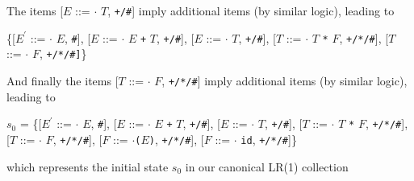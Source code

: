 \documentclass[8pt,a4paper,compress,handout]{beamer}
\newcommand{\mm}[1]{$#1$}
\newcommand{\expo}[2]{$#1^{#2}$}
\newcommand{\subs}[2]{${#1}_{#2}$}
\newenvironment{spaced}
{
\smallskip
\hspace{.5cm}
\begin{minipage}[c]{\textwidth}
}
{
\end{minipage}
\smallskip
}
\begin{document}
\begin{frame}[fragile]
\pause

The items [$E$  ::= $\cdot$ $T$, \lstinline{+/#}] imply additional items (by similar logic), leading to

\text{ }
\begin{spaced}
\begin{production}
\{[\expo{E}{\prime} ::= \mm{\cdot} \mm{E}, \lstinline{#}],
  [\mm{E}  ::= \mm{\cdot} \mm{E} \lstinline{+} \mm{T}, \lstinline{+/#}],
  [\mm{E}  ::= \mm{\cdot} \mm{T}, \lstinline{+/#}],
  [\mm{T}  ::= \mm{\cdot} \mm{T}  \lstinline{*} \mm{F}, \lstinline{+/*/#}],
  [\mm{T}  ::= \mm{\cdot} \mm{F}, \lstinline{+/*/#]}\}
\end{production}
\end{spaced}

\pause

And finally the items [$T$ ::= $\cdot$ $F$, \lstinline{+/*/#}] imply additional items (by similar logic), leading to

\text{ }
\begin{spaced}
\begin{production}
\subs{s}{0} = \{[\expo{E}{\prime} ::= \mm{\cdot} \mm{E}, \lstinline{#}],
         [\mm{E}  ::= \mm{\cdot} \mm{E} \lstinline{+} \mm{T}, \lstinline{+/#}],
         [\mm{E}  ::= \mm{\cdot} \mm{T}, \lstinline{+/#}],
         [\mm{T}  ::= \mm{\cdot} \mm{T} \lstinline{*} \mm{F}, \lstinline{+/*/#}],
         [\mm{T}  ::= \mm{\cdot} \mm{F}, \lstinline{+/*/#}],
         [\mm{F}  ::= \mm{\cdot}\lstinline{(}\mm{E}\lstinline{)}, \lstinline{+/*/#}],
         [\mm{F}  ::= \mm{\cdot} \lstinline{id}, \lstinline{+/*/#}]\}
\end{production}
\end{spaced}

\noindent which represents the initial state $s_0$ in our canonical LR(1) collection
\end{frame}
\end{document}
